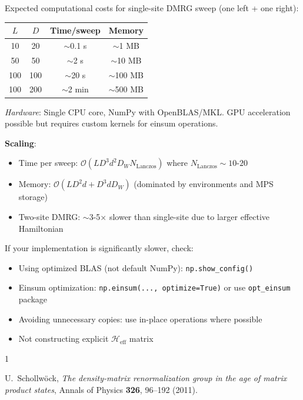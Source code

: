 \documentclass[aps,prb,onecolumn,scriptaddress]{revtex4-2}
\newcommand{\Order}{\mathcal{O}}
\begin{document}
Expected computational costs for single-site DMRG sweep (one left + one right):

\begin{center}
	\begin{tabular}{@{}cccc@{}}
		\toprule
		$L$ & $D$ & Time/sweep & Memory \\
		\midrule
		10 & 20 & $\sim$0.1 s & $\sim$1 MB \\
		50 & 50 & $\sim$2 s & $\sim$10 MB \\
		100 & 100 & $\sim$20 s & $\sim$100 MB \\
		100 & 200 & $\sim$2 min & $\sim$500 MB \\
		\bottomrule
	\end{tabular}
\end{center}

\textit{Hardware}: Single CPU core, NumPy with OpenBLAS/MKL. GPU acceleration possible but requires custom kernels for einsum operations.

\textbf{Scaling}: 
\begin{itemize}
	\item Time per sweep: $\Order(L D^3 d^2 D_W N_{\text{Lanczos}})$ where $N_{\text{Lanczos}} \sim 10$-$20$
	\item Memory: $\Order(L D^2 d + D^3 d D_W)$ (dominated by environments and MPS storage)
	\item Two-site DMRG: $\sim$3-5$\times$ slower than single-site due to larger effective Hamiltonian
\end{itemize}

If your implementation is significantly slower, check:
\begin{itemize}
	\item Using optimized BLAS (not default NumPy): \texttt{np.show\_config()}
	\item Einsum optimization: \texttt{np.einsum(..., optimize=True)} or use \texttt{opt\_einsum} package
	\item Avoiding unnecessary copies: use in-place operations where possible
	\item Not constructing explicit $\mathcal{H}_{\text{eff}}$ matrix
\end{itemize}


\begin{thebibliography}{1}
	
	U.~Schollw\"ock,
	\textit{The density-matrix renormalization group in the age of matrix product states},
	Annals of Physics \textbf{326}, 96--192 (2011).
	
\end{thebibliography}
\end{document}
